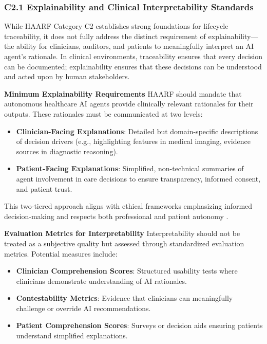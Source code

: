 \documentclass[11pt]{article}
\begin{document}
\subsubsection{C2.1 Explainability and Clinical Interpretability Standards}

While HAARF Category C2 establishes strong foundations for lifecycle traceability, it does not fully address the distinct requirement of explainability—the ability for clinicians, auditors, and patients to meaningfully interpret an AI agent’s rationale. In clinical environments, traceability ensures that every decision can be documented; explainability ensures that these decisions can be understood and acted upon by human stakeholders.

\textbf{Minimum Explainability Requirements}  
HAARF should mandate that autonomous healthcare AI agents provide clinically relevant rationales for their outputs. These rationales must be communicated at two levels:
\begin{itemize}
    \item \textbf{Clinician-Facing Explanations}: Detailed but domain-specific descriptions of decision drivers (e.g., highlighting features in medical imaging, evidence sources in diagnostic reasoning).
    \item \textbf{Patient-Facing Explanations}: Simplified, non-technical summaries of agent involvement in care decisions to ensure transparency, informed consent, and patient trust.
\end{itemize}

This two-tiered approach aligns with ethical frameworks emphasizing informed decision-making and respects both professional and patient autonomy \cite{jobin2019global,tonekaboni2019explainable}.

\textbf{Evaluation Metrics for Interpretability}  
Interpretability should not be treated as a subjective quality but assessed through standardized evaluation metrics. Potential measures include:
\begin{itemize}
    \item \textbf{Clinician Comprehension Scores}: Structured usability tests where clinicians demonstrate understanding of AI rationales.
    \item \textbf{Contestability Metrics}: Evidence that clinicians can meaningfully challenge or override AI recommendations.
    \item \textbf{Patient Comprehension Scores}: Surveys or decision aids ensuring patients understand simplified explanations.
\end{itemize}
\end{document}
